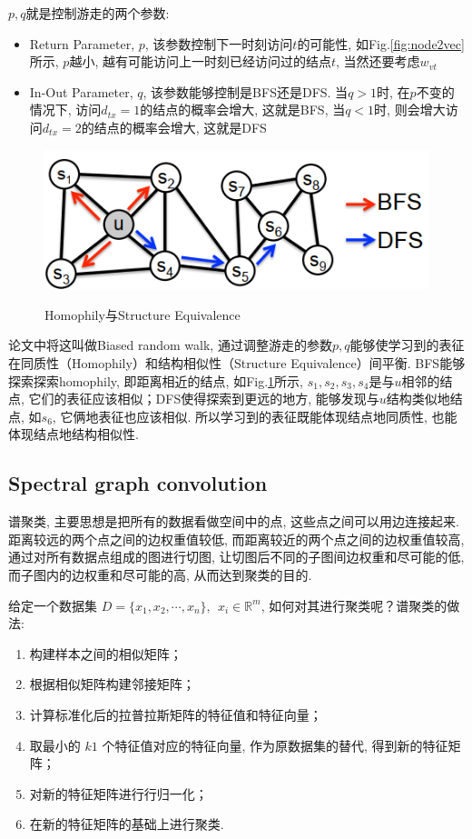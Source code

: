 $p, q$就是控制游走的两个参数: 
\begin{itemize}
	\item Return Parameter, $p$, 该参数控制下一时刻访问$t$的可能性, 如Fig.\ref{fig:node2vec}所示, $p$越小, 越有可能访问上一时刻已经访问过的结点$t$, 当然还要考虑$w_{vt}$
	\item In-Out Parameter, $q$, 该参数能够控制是BFS还是DFS. 当$q>1$时, 在$p$不变的情况下, 访问$d_{tx} = 1$的结点的概率会增大, 这就是BFS, 当$q<1$时, 则会增大访问$d_{tx} = 2$的结点的概率会增大, 这就是DFS
\end{itemize}
\begin{figure}[h]
	\centering
	\includegraphics[width=.8\textwidth]{pics/node2vec2.png}
	\label{fig:node2vec2}
	\caption{Homophily与Structure Equivalence}
\end{figure}

论文中将这叫做Biased random walk, 通过调整游走的参数$p,q$能够使学习到的表征在同质性（Homophily）和结构相似性（Structure Equivalence）间平衡. BFS能够探索探索homophily, 即距离相近的结点, 如Fig.\ref{fig:node2vec2}所示, $s_1, s_2, s_3, s_4$是与$u$相邻的结点, 它们的表征应该相似；DFS使得探索到更远的地方, 能够发现与$u$结构类似地结点, 如$s_6$, 它俩地表征也应该相似. 所以学习到的表征既能体现结点地同质性, 也能体现结点地结构相似性. 

\subsection{Spectral graph convolution}
谱聚类, 主要思想是把所有的数据看做空间中的点, 这些点之间可以用边连接起来. 距离较远的两个点之间的边权重值较低, 而距离较近的两个点之间的边权重值较高, 通过对所有数据点组成的图进行切图, 让切图后不同的子图间边权重和尽可能的低, 而子图内的边权重和尽可能的高, 从而达到聚类的目的. 

给定一个数据集 $D = \{x_1, x_2, \cdots, x_n\},\ \ x_i \in \mathbb{R}^m$, 如何对其进行聚类呢？谱聚类的做法: 
\begin{enumerate}
	\item 构建样本之间的相似矩阵；
	\item 根据相似矩阵构建邻接矩阵；
	\item 计算标准化后的拉普拉斯矩阵的特征值和特征向量；
	\item 取最小的 $k1$ 个特征值对应的特征向量, 作为原数据集的替代, 得到新的特征矩阵；
	\item 对新的特征矩阵进行行归一化；
	\item 在新的特征矩阵的基础上进行聚类. 
\end{enumerate}

